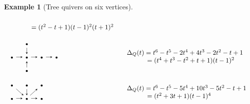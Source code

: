 \documentclass[11pt, letterpaper]{amsart}
\theoremstyle{definition}
\newtheorem{example}[theorem]{Example}
\numberwithin{equation}{section}
\begin{document}
\begin{example}[Tree quivers on six vertices]
\begin{equation*}
\begin{array}{ll}
\begin{array}{l}
\\ \hspace{31pt}=(t^2 - t + 1)(t - 1)^2(t + 1)^2
\end{array}
\\[20pt]
\begin{tikzcd}[arrows={-stealth}, sep=1em]
& \scriptstyle\bullet \arrow[d] \\
  \scriptstyle\bullet  \arrow[r]   & \scriptstyle\bullet  \arrow[r] & \scriptstyle\bullet \arrow[r] & \scriptstyle\bullet \\
 & \scriptstyle\bullet  \arrow[u] &  
   & 
\end{tikzcd}
& \begin{array}{l}\ \\[-9pt]
\Delta_Q(t)=t^6 - t^5 - 2t^4 + 4t^3 - 2t^2 - t + 1\\ \hspace{31pt} 
   =(t^4 + t^3 - t^2 + t + 1)(t - 1)^2 \end{array}
\\[32pt]
\begin{tikzcd}[arrows={-stealth}, sep=1em]
\scriptstyle\bullet \arrow[dr] & \scriptstyle\bullet \arrow[d] & \scriptstyle\bullet \\
  \scriptstyle\bullet  \arrow[r]   & \scriptstyle\bullet  \arrow[r] \arrow[ru] & \scriptstyle\bullet 
\end{tikzcd}
& \begin{array}{l}\ \\[-6pt]
\Delta_Q(t)=t^6 - t^5 - 5t^4 + 10t^3 - 5t^2 - t + 1 \\ \hspace{31pt} = (t^2 + 3t + 1)(t - 1)^4\end{array}
\end{array}
\vspace{10pt}
\end{equation*}
\end{example}
\end{document}
